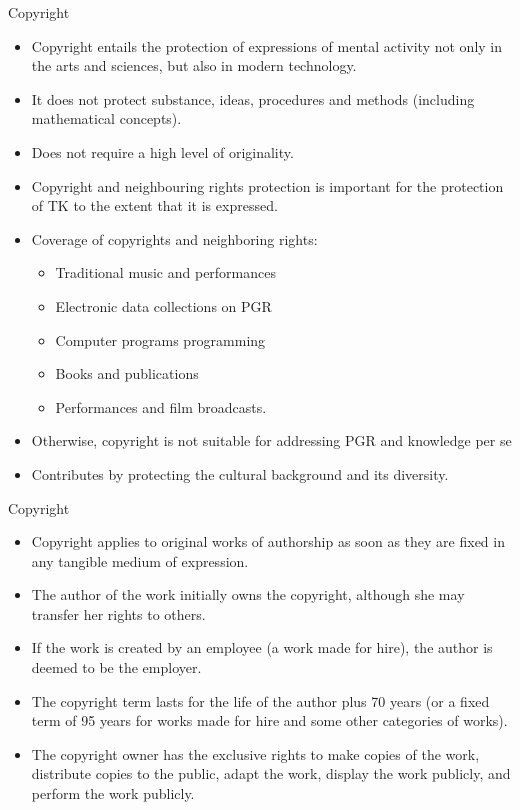 \documentclass[
  ignorenonframetext,
  aspectratio=169]{beamer}
\providecommand{\tightlist}{%
  \setlength{\itemsep}{0pt}\setlength{\parskip}{0pt}}
\begin{document}
\begin{frame}{Copyright}
\protect\hypertarget{copyright}{}
\small

\begin{itemize}
\tightlist
\item
  Copyright entails the protection of expressions of mental activity not
  only in the arts and sciences, but also in modern technology.
\item
  It does not protect substance, ideas, procedures and methods
  (including mathematical concepts).
\item
  Does not require a high level of originality.
\item
  Copyright and neighbouring rights protection is important for the
  protection of TK to the extent that it is expressed.
\item
  Coverage of copyrights and neighboring rights:

  \begin{itemize}
  \tightlist
  \item
    Traditional music and performances
  \item
    Electronic data collections on PGR
  \item
    Computer programs programming
  \item
    Books and publications
  \item
    Performances and film broadcasts.
  \end{itemize}
\item
  Otherwise, copyright is not suitable for addressing PGR and knowledge
  per se
\item
  Contributes by protecting the cultural background and its diversity.
\end{itemize}
\end{frame}

\begin{frame}{Copyright}
\protect\hypertarget{copyright-1}{}
\begin{itemize}
\tightlist
\item
  Copyright applies to original works of authorship as soon as they are
  fixed in any tangible medium of expression.
\item
  The author of the work initially owns the copyright, although she may
  transfer her rights to others.
\item
  If the work is created by an employee (a work made for hire), the
  author is deemed to be the employer.
\item
  The copyright term lasts for the life of the author plus 70 years (or
  a fixed term of 95 years for works made for hire and some other
  categories of works).
\item
  The copyright owner has the exclusive rights to make copies of the
  work, distribute copies to the public, adapt the work, display the
  work publicly, and perform the work publicly.
\end{itemize}
\end{frame}
\end{document}
